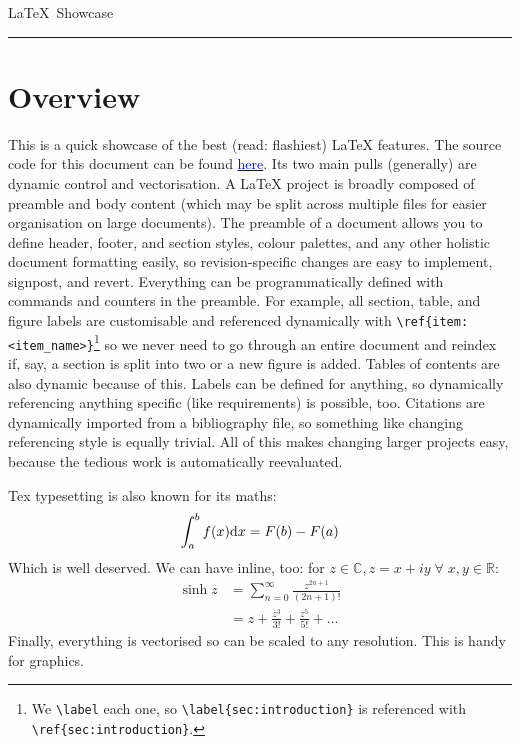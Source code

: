 \documentclass[12pt]{article}
\renewcommand{\d}[1]{\textnormal{d}#1} %
\begin{document}
\VerbatimFootnotes %

\begin{center}
  \large
  \LaTeX\ Showcase
  \vspace{0.5\headsep}
  \hrule
\end{center}

\section{Overview}

This is a quick showcase of the best (read: flashiest) LaTeX features.
The source code for this document can be found \href{https://github.com/thomas-sheard/tex_showcase}{\textcolor{blue}{here}}.
Its two main pulls (generally) are dynamic control and vectorisation. 
A LaTeX project is broadly composed of preamble and body content (which may be split across multiple files for easier organisation on large documents).
The preamble of a document allows you to define header, footer, and section styles, colour palettes, and any other holistic document formatting easily, so revision-specific changes are easy to implement, signpost, and revert.
Everything can be programmatically defined with commands and counters in the preamble. 
For example, all section, table, and figure labels are customisable and referenced dynamically with \verb|\ref{item:<item_name>}|\footnote{We \verb|\label| each one, so \verb|\label{sec:introduction}| is referenced with \verb|\ref{sec:introduction}|.}
so we never need to go through an entire document and reindex if, say, a section is split into two or a new figure is added. 
Tables of contents are also dynamic because of this. 
Labels can be defined for anything, so dynamically referencing anything specific (like requirements) is possible, too. 
Citations are dynamically imported from a bibliography file, so something like changing referencing style is equally trivial. 
All of this makes changing larger projects easy, because the tedious work is automatically reevaluated.
\par
Tex typesetting is also known for its maths:
\begin{equation*}
  \int_{a}^{b} f(x) \d{x} = F(b) - F(a)
\end{equation*}
Which is well deserved. We can have inline, too: for $z \in \mathbb{C}, z = x+iy \; \forall \; x, y \in \mathbb{R}$:
\begin{align*}
  \sinh z &= \sum_{n=0}^{\infty} \frac{z^{2n+1}}{(2n+1)!} \\
          &= z + \frac{z^3}{3!} + \frac{z^5}{5!} + ...
\end{align*}
Finally, everything is vectorised so can be scaled to any resolution. This is handy for graphics. 
\end{document}
